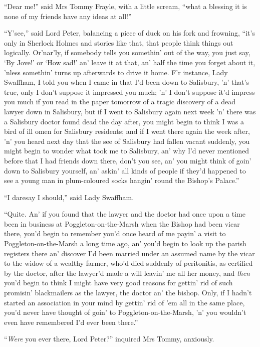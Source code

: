 \enquote{Dear me!} said Mrs Tommy Frayle, with a little scream, \enquote{what a blessing it is none of my friends have any ideas at all!}

\enquote{Y’see,} said Lord Peter, balancing a piece of duck on his fork and frowning, \enquote{it’s only in Sherlock Holmes and stories like that, that people think things out logically. Or’nar’ly, if somebody tells you somethin’ out of the way, you just say, \enquote{By Jove!} or \enquote{How sad!} an’ leave it at that, an’ half the time you forget about it, ’nless somethin’ turns up afterwards to drive it home. F’r instance, Lady Swaffham, I told you when I came in that I’d been down to Salisbury, ’n’ that’s true, only I don’t suppose it impressed you much; ’n’ I don’t suppose it’d impress you much if you read in the paper tomorrow of a tragic discovery of a dead lawyer down in Salisbury, but if I went to Salisbury again next week ’n’ there was a Salisbury doctor found dead the day after, you might begin to think I was a bird of ill omen for Salisbury residents; and if I went there again the week after, ’n’ you heard next day that the see of Salisbury had fallen vacant suddenly, you might begin to wonder what took me to Salisbury, an’ why I’d never mentioned before that I had friends down there, don’t you see, an’ you might think of goin’ down to Salisbury yourself, an’ askin’ all kinds of people if they’d happened to see a young man in plum-coloured socks hangin’ round the Bishop’s Palace.}

\enquote{I daresay I should,} said Lady Swaffham.

\enquote{Quite. An’ if you found that the lawyer and the doctor had once upon a time been in business at Poggleton-on-the-Marsh when the Bishop had been vicar there, you’d begin to remember you’d once heard of me payin’ a visit to Poggleton-on-the-Marsh a long time ago, an’ you’d begin to look up the parish registers there an’ discover I’d been married under an assumed name by the vicar to the widow of a wealthy farmer, who’d died suddenly of peritonitis, as certified by the doctor, after the lawyer’d made a will leavin’ me all her money, and \textit{then} you’d begin to think I might have very good reasons for gettin’ rid of such promisin’ blackmailers as the lawyer, the doctor an’ the bishop. Only, if I hadn’t started an association in your mind by gettin’ rid of ’em all in the same place, you’d never have thought of goin’ to Poggleton-on-the-Marsh, ’n’ you wouldn’t even have remembered I’d ever been there.}

\enquote{\textit{Were} you ever there, Lord Peter?} inquired Mrs Tommy, anxiously.

